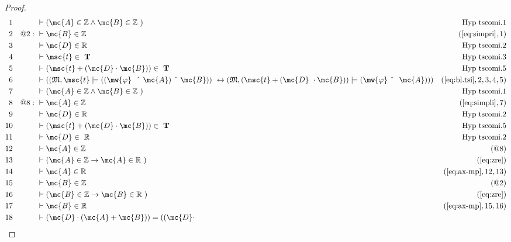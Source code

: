 \begin{proof}
\begin{align}
  1 &&  & \vdash ( \mc{A} \in \mathbb{Z} \wedge \mc{B} \in \mathbb{Z}
     ~)&\text{Hyp~tscomi.1}\notag%
  \\ 2 && @2:\  & \vdash \mc{B} \in \mathbb{Z}&(\mbox{\ref{eq:simpri}},1)\notag
  \\ 3 &&  & \vdash \mc{D} \in \mathbb{R}&\text{Hyp~tscomi.2}\notag%
  \\ 4 &&  & \vdash \msc{t} \in
     ~\mathbf{T}&\text{Hyp~tscomi.3}\notag%
  \\ 5 &&  & \vdash ( \msc{t} + ( \mc{D} \cdot \mc{B} ) ) \in
     ~\mathbf{T}&\text{Hyp~tscomi.5}\notag%
  \\ 6 &&  & \vdash ( ( \mathfrak{M} , \msc{t} \models ( ( \mw{\varphi}
     ~~\string^~ \mc{A} ) ~\string^~ \mc{B} ) )
     ~\leftrightarrow ( \mathfrak{M} , ( \msc{t} + ( \mc{D}
     ~\cdot \mc{B} ) ) \models ( \mw{\varphi} ~\string^~
     ~\mc{A} ) ) )&(\mbox{\ref{eq:bl.tsi}},2,3,4,5)\notag
  \\ 7 &&  & \vdash ( \mc{A} \in \mathbb{Z} \wedge \mc{B} \in \mathbb{Z}
     ~)&\text{Hyp~tscomi.1}\notag%
  \\ 8 && @8:\  & \vdash \mc{A} \in \mathbb{Z}&(\mbox{\ref{eq:simpli}},7)\notag
  \\ 9 &&  & \vdash \mc{D} \in \mathbb{R}&\text{Hyp~tscomi.2}\notag%
  \\ 10 &&  & \vdash ( \msc{t} + ( \mc{D} \cdot \mc{B} ) ) \in
     ~\mathbf{T}&\text{Hyp~tscomi.5}\notag%
  \\ 11 &&  & \vdash \mc{D} \in
     ~\mathbb{R}&\text{Hyp~tscomi.2}\notag%
  \\ 12 &&  & \vdash \mc{A} \in \mathbb{Z}&(@8)\notag
  \\ 13 &&  & \vdash ( \mc{A} \in \mathbb{Z} \rightarrow \mc{A} \in \mathbb{R}
     ~)&(\mbox{\ref{eq:zre}})\notag
  \\ 14 &&  & \vdash \mc{A} \in \mathbb{R}&(\mbox{\ref{eq:ax-mp}},12,13)\notag
  \\ 15 &&  & \vdash \mc{B} \in \mathbb{Z}&(@2)\notag
  \\ 16 &&  & \vdash ( \mc{B} \in \mathbb{Z} \rightarrow \mc{B} \in \mathbb{R}
     ~)&(\mbox{\ref{eq:zre}})\notag
  \\ 17 &&  & \vdash \mc{B} \in \mathbb{R}&(\mbox{\ref{eq:ax-mp}},15,16)\notag
  \\ 18 &&  & \vdash ( \mc{D} \cdot ( \mc{A} + \mc{B} ) ) = ( ( \mc{D} \cdot

\end{align}
\end{proof}
